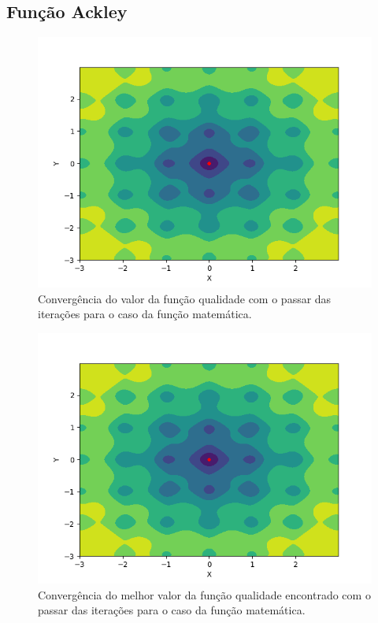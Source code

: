 \documentclass[conference]{IEEEtran}
\begin{document}
\subsection{Função Ackley}

\begin{figure}[htbp]
\centering
\centerline{\includegraphics[scale=0.4]{imagens/ackley/ses.png}}
\caption{Convergência do valor da função qualidade com o passar das iterações para o caso da função matemática.}
\label{ackley/ses}
\end{figure} 

\begin{figure}[htbp]
\centering
\centerline{\includegraphics[scale=0.4]{imagens/ackley/cmaes.png}}
\caption{Convergência do melhor valor da função qualidade encontrado com o passar das iterações para o caso da função matemática.}
\label{ackley/cmaes}
\end{figure}
\end{document}
